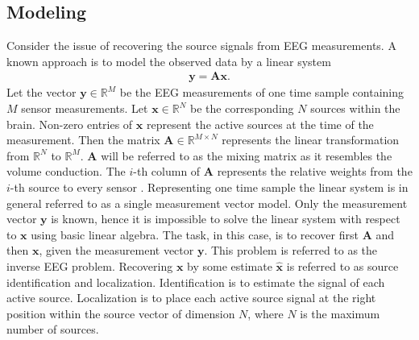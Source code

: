 %     


\subsection{Modeling}
Consider the issue of recovering the source signals from EEG measurements. A known approach is to model the observed data by a linear system 
\begin{align*}
\mathbf{y} = \mathbf{Ax}.
\end{align*}
Let the vector $\mathbf{y} \in \mathbb{R}^{M}$ be the EEG measurements of one time sample containing $M$ sensor measurements. Let $\mathbf{x} \in \mathbb{R}^{N}$ be the corresponding $N$ sources within the brain. 
Non-zero entries of $\textbf{x}$ represent the active sources at the time of the measurement. 
Then the matrix $\mathbf{A} \in \mathbb{R}^{M \times N}$ represents the linear transformation from $\mathbb{R}^{N}$ to $\mathbb{R}^{M}$. $\mathbf{A}$ will be referred to as the mixing matrix as it resembles the volume conduction. 
The $i$-th column of $\mathbf{A}$ represents the relative weights from the $i$-th source to every sensor \cite{phd2015}. 
Representing one time sample the linear system is in general referred to as a single measurement vector model. 
Only the measurement vector $\mathbf{y}$ is known, hence it is impossible to solve the linear system with respect to $\mathbf{x}$ using basic linear algebra. 
The task, in this case, is to recover first $\mathbf{A}$ and then $\mathbf{x}$, given the measurement vector $\mathbf{y}$. This problem is referred to as the inverse EEG problem. 
Recovering $\mathbf{x}$ by some estimate $\hat{\mathbf{x}}$ is referred to as source identification and localization. Identification is to estimate the signal of each active source. Localization is to place each active source signal at the right position within the source vector of dimension $N$, where $N$ is the maximum number of sources.      

